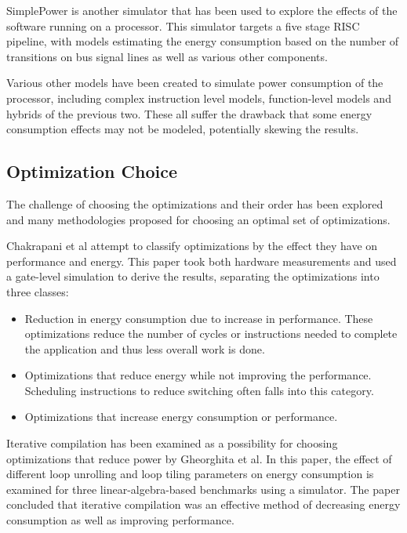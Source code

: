 \documentclass[twocolumn]{article}
\begin{document}
SimplePower\cite{SimplePower} is another simulator that has been used to explore the effects of the software running on a processor. This simulator targets a five stage RISC pipeline, with models estimating the energy consumption based on the number of transitions on bus signal lines as well as various other components.

Various other models have been created to simulate power consumption of the processor, including complex instruction level models\cite{Steinke2001}, function-level models\cite{Qu2000} and hybrids of the previous two\cite{Blume2007}. These all suffer the drawback that some energy consumption effects may not be modeled, potentially skewing the results.

\subsection{Optimization Choice}

The challenge of choosing the optimizations and their order has been explored and many methodologies proposed for choosing an optimal set of optimizations.

Chakrapani et al attempt to classify optimizations by the effect they have on performance and energy\cite{WhatCanAPoorCompilerDo}. This paper took both hardware measurements and used a gate-level simulation to derive the results, separating the optimizations into three classes:
\begin{itemize}
	\setlength{\itemsep}{0em}
	\vspace{-1mm}
	\item Reduction in energy consumption due to increase in performance. These optimizations reduce the number of cycles or instructions needed to complete the application and thus less overall work is done.
	\item Optimizations that reduce energy while not improving the performance. Scheduling instructions to reduce switching often falls into this category.
	\item Optimizations that increase energy consumption or performance.
\end{itemize}

Iterative compilation has been examined as a possibility for choosing optimizations that reduce power by Gheorghita et al\cite{IterativeCompilationForEnergy}. In this paper, the effect of different loop unrolling and loop tiling parameters on energy consumption is examined for three linear-algebra-based benchmarks using a simulator. The paper concluded that iterative compilation was an effective method of decreasing energy consumption as well as improving performance.
\end{document}
